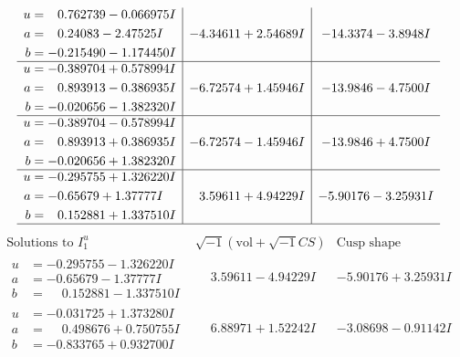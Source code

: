 \documentclass[1p]{elsarticle_modified}
\theoremstyle{definition}
\newcommand{\I}{\sqrt{-1}}
\begin{document}
$$\begin{array}{c|c|c}
\begin{aligned}
u &= \phantom{-}0.762739 - 0.066975 I \\
a &= \phantom{-}0.24083 - 2.47525 I \\
b &= -0.215490 - 1.174450 I\end{aligned}
 & -4.34611 + 2.54689 I & -14.3374 - 3.8948 I \\ \hline\begin{aligned}
u &= -0.389704 + 0.578994 I \\
a &= \phantom{-}0.893913 - 0.386935 I \\
b &= -0.020656 - 1.382320 I\end{aligned}
 & -6.72574 + 1.45946 I & -13.9846 - 4.7500 I \\ \hline\begin{aligned}
u &= -0.389704 - 0.578994 I \\
a &= \phantom{-}0.893913 + 0.386935 I \\
b &= -0.020656 + 1.382320 I\end{aligned}
 & -6.72574 - 1.45946 I & -13.9846 + 4.7500 I \\ \hline\begin{aligned}
u &= -0.295755 + 1.326220 I \\
a &= -0.65679 + 1.37777 I \\
b &= \phantom{-}0.152881 + 1.337510 I\end{aligned}
 & \phantom{-}3.59611 + 4.94229 I & -5.90176 - 3.25931 I\\
 \hline 
 \end{array}$$\newpage$$\begin{array}{c|c|c}  
\text{Solutions to }I^u_{1}& \I (\text{vol} + \sqrt{-1}CS) & \text{Cusp shape}\\
 \hline 
\begin{aligned}
u &= -0.295755 - 1.326220 I \\
a &= -0.65679 - 1.37777 I \\
b &= \phantom{-}0.152881 - 1.337510 I\end{aligned}
 & \phantom{-}3.59611 - 4.94229 I & -5.90176 + 3.25931 I \\ \hline\begin{aligned}
u &= -0.031725 + 1.373280 I \\
a &= \phantom{-}0.498676 + 0.750755 I \\
b &= -0.833765 + 0.932700 I\end{aligned}
 & \phantom{-}6.88971 + 1.52242 I & -3.08698 - 0.91142 I \\ \hline\begin{aligned}

\end{aligned}
\end{array}$$
\end{document}
